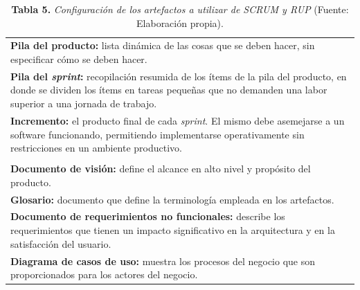\FloatBarrier %
		\begin{table}[htb]
			\small
			\caption{\textbf{Tabla 5.} \textit{Configuraci\'{o}n de los artefactos a utilizar de SCRUM y RUP} (Fuente: Elaboraci\'{o}n propia).}
			\centering
			\setlength{\extrarowheight}{5pt}
			\begin{tabulary}{15cm}{|J|}
				\hline
				\\ \hline
				\textbf{Pila del producto: }lista din\'{a}mica de las cosas que se deben hacer, sin especificar c\'{o}mo se deben hacer.\\ \hline
				\textbf{Pila del \textit{sprint}:} recopilaci\'{o}n resumida de los \'{i}tems de la pila del producto, en donde se dividen los \'{i}tems en tareas peque\~{n}as que no demanden una labor superior a una jornada de trabajo.\\ \hline
				\textbf{Incremento: }el producto final de cada \textit{sprint}. El mismo debe asemejarse a un software funcionando, permitiendo implementarse operativamente sin restricciones en un ambiente productivo.\\ \hline
				\\ \hline
				\textbf{Documento de visi\'{o}n: }define el alcance en alto nivel y prop\'{o}sito del producto.\\
\hline
				\textbf{Glosario: }documento que define la terminolog\'{i}a empleada en los artefactos.\\ \hline
				\textbf{Documento de requerimientos no funcionales: }describe los requerimientos que tienen un impacto significativo en la arquitectura y en la satisfacci\'{o}n del usuario.\\ \hline
		\textbf{Diagrama de casos de uso: }muestra los procesos del negocio que son proporcionados para los actores del negocio.\\ \hline
			\end{tabulary}
		\end{table}
\FloatBarrier %